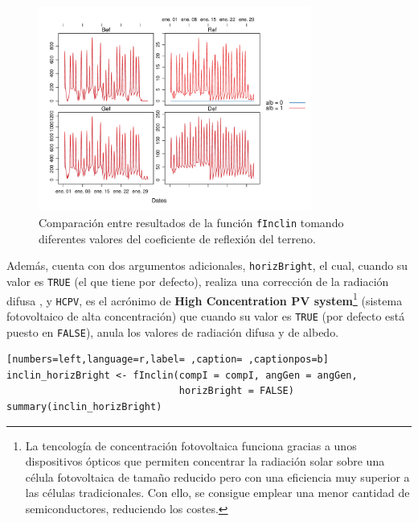 \begin{itemize}
\begin{figure}[!htb]
\centering
\includegraphics[width=0.8\textwidth]{figuras/codigo-finclinalb.pdf}
\caption{Comparación entre resultados de la función \texttt{fInclin} tomando diferentes valores del coeficiente de reflexión del terreno.}
\end{figure}
Además, cuenta con dos argumentos adicionales, \texttt{horizBright}, el cual, cuando su valor es \texttt{TRUE} (el que tiene por defecto), realiza una corrección de la radiación difusa \cite{REINDL19909}, y \texttt{HCPV}, es el acrónimo de \textbf{High Concentration PV system}\footnote{La tencología de concentración fotovoltaica funciona gracias a unos dispositivos ópticos que permiten concentrar la radiación solar sobre una célula fotovoltaica de tamaño reducido pero con una eficiencia muy superior a las células tradicionales. Con ello, se consigue emplear una menor cantidad de semiconductores, reduciendo los costes.} (sistema fotovoltaico de alta concentración) que cuando su valor es \texttt{TRUE} (por defecto está puesto en \texttt{FALSE}), anula los valores de radiación difusa y de albedo.
\begin{lstlisting}[numbers=left,language=r,label= ,caption= ,captionpos=b]
inclin_horizBright <- fInclin(compI = compI, angGen = angGen,
                              horizBright = FALSE)
summary(inclin_horizBright)
\end{lstlisting}


\end{itemize}
